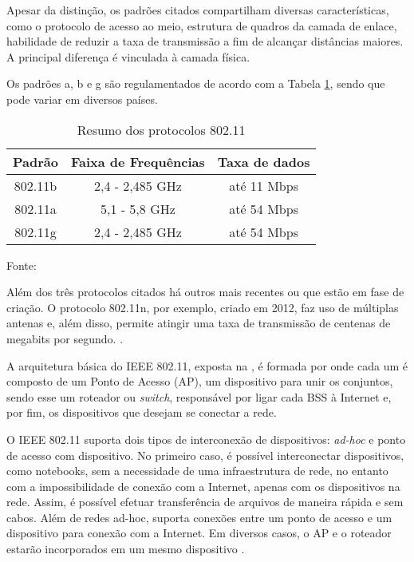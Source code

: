 Apesar da distinção, os padrões citados compartilham diversas características, como o protocolo de acesso ao meio, estrutura de quadros da camada de enlace, habilidade de reduzir a taxa de transmissão a fim de alcançar distâncias maiores. A principal diferença é vinculada à camada física.

Os padrões a, b e g são regulamentados de acordo com a Tabela \ref{tab:ieee80211abg-phy}, sendo que pode variar em diversos países.

\begin{table}[hbt]
    \caption{Resumo dos protocolos 802.11}
    \label{tab:ieee80211abg-phy}
    \centering
    \begin{tabular}{@{}ccc@{}}
        \toprule
        \textbf{Padrão} & \textbf{Faixa de Frequências} & \textbf{Taxa de dados} \\ \midrule
        802.11b         & 2,4 - 2,485 GHz               & até 11 Mbps            \\
        802.11a         & 5,1 - 5,8 GHz                 & até 54 Mbps            \\
        802.11g         & 2,4 - 2,485 GHz               & até 54 Mbps            \\ \bottomrule 
        \end{tabular}
        
    Fonte: \cite{Kurose2012}
\end{table}



Além dos três protocolos citados há outros mais recentes ou que estão em fase de criação. O protocolo 802.11n, por exemplo, criado em 2012, faz uso de múltiplas antenas e, além disso, permite atingir uma taxa de transmissão de centenas de megabits por segundo. \cite{Kurose2012}.

A arquitetura básica do IEEE 802.11, exposta na ,  é formada por  onde cada um é composto de um Ponto de Acesso (AP), um dispositivo para unir os conjuntos, sendo esse um roteador ou \textit{switch}, responsável por ligar cada BSS à Internet e, por fim, os dispositivos que desejam se conectar a rede.



O IEEE 802.11 suporta dois tipos de interconexão de dispositivos: \textit{ad-hoc} e ponto de acesso com dispositivo. No primeiro caso, é possível interconectar dispositivos, como notebooks, sem a necessidade de uma infraestrutura de rede, no entanto com a impossibilidade de conexão com a Internet, apenas com os dispositivos na rede. Assim, é possível efetuar transferência de arquivos de maneira rápida e sem cabos. Além de redes ad-hoc, suporta conexões entre um ponto de acesso e um dispositivo para conexão com a Internet. Em diversos casos, o AP e o roteador estarão incorporados em um mesmo dispositivo \cite{Kurose2012}.

